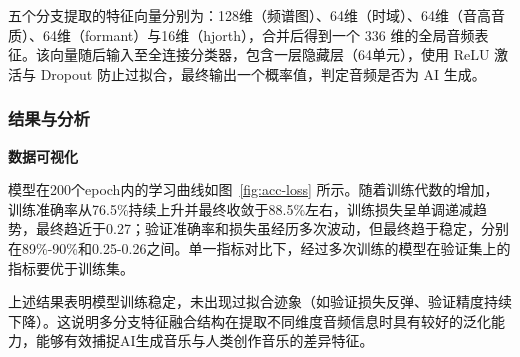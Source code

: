 \documentclass[a4paper,12pt]{article}
\begin{document}
五个分支提取的特征向量分别为：128维（频谱图）、64维（时域）、64维（音高音质）、64维（formant）与16维（hjorth），合并后得到一个 $336$ 维的全局音频表征。该向量随后输入至全连接分类器，包含一层隐藏层（64单元），使用 ReLU 激活与 Dropout 防止过拟合，最终输出一个概率值，判定音频是否为 AI 生成。



\subsubsection{结果与分析}
\noindent\textbf{数据可视化}\par
模型在200个epoch内的学习曲线如图~\ref{fig:acc-loss} 所示。随着训练代数的增加，训练准确率从76.5\%持续上升并最终收敛于88.5\%左右，训练损失呈单调递减趋势，最终趋近于0.27；验证准确率和损失虽经历多次波动，但最终趋于稳定，分别在89\%-90\%和0.25-0.26之间。单一指标对比下，经过多次训练的模型在验证集上的指标要优于训练集。

上述结果表明模型训练稳定，未出现过拟合迹象（如验证损失反弹、验证精度持续下降）。这说明多分支特征融合结构在提取不同维度音频信息时具有较好的泛化能力，能够有效捕捉AI生成音乐与人类创作音乐的差异特征。





\end{document}
